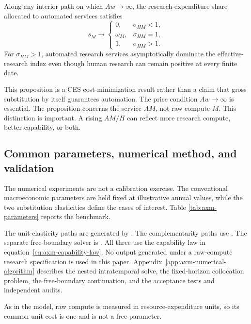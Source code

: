 \begin{proposition}
\label{prop:axm-research-automation}
Along any interior path on which \(Aw\to\infty\), the research-expenditure share
allocated to automated services satisfies
\[
 s_M\to
 \begin{cases}
  0,&\sigma_{HM}<1,\\
  \omega_M,&\sigma_{HM}=1,\\
  1,&\sigma_{HM}>1.
 \end{cases}
\]
For \(\sigma_{HM}>1\), automated research services asymptotically dominate the
effective-research index even though human research can remain positive at every
finite date.
\end{proposition}

This proposition is a CES cost-minimization result rather than a claim that gross
substitution by itself guarantees automation. The price condition
\(Aw\to\infty\) is essential.
The proposition concerns the service \(AM\), not raw compute \(M\). This
distinction is important. A rising \(AM/H\) can reflect more research compute,
better capability, or both.

\subsection{Common parameters, numerical method, and validation}

The numerical experiments are not a calibration exercise. The conventional
macroeconomic parameters are held fixed at illustrative annual values, while the
two substitution elasticities define the cases of interest. Table
\ref{tab:axm-parameters} reports the benchmark.

The unit-elasticity paths are generated by
. The complementarity paths use
. The separate
free-boundary solver is
. All three use the
capability law in equation~\eqref{eq:axm-capability-law}. No output generated under a
raw-compute research specification is used in this paper.
Appendix~\ref{app:axm-numerical-algorithm} describes the nested intratemporal
solve, the fixed-horizon collocation problem, the free-boundary continuation, and
the acceptance tests and independent audits.

As in the model, raw compute is measured in resource-expenditure units, so its
common unit cost is one and is not a free parameter.

